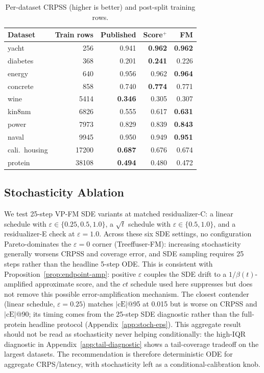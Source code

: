 \documentclass{tpm2026}
\begin{document}
\begin{table}[!t]
  \centering
  \caption{Per-dataset CRPSS (higher is better) and post-split training rows.}\label{tab:per-dataset}
  \footnotesize
  \begin{tabular}{lrrrr}
    \toprule
    Dataset & Train rows & Published & Score$^+$ & FM \\
    \midrule
    yacht & 256 & 0.941 & \textbf{0.962} & \textbf{0.962} \\
    diabetes & 368 & 0.201 & \textbf{0.241} & 0.226 \\
    energy & 640 & 0.956 & 0.962 & \textbf{0.964} \\
    concrete & 858 & 0.740 & \textbf{0.774} & 0.771 \\
    wine & 5414 & \textbf{0.346} & 0.305 & 0.307 \\
    kin8nm & 6826 & 0.555 & 0.617 & \textbf{0.631} \\
    power & 7973 & 0.829 & 0.839 & \textbf{0.843} \\
    naval & 9945 & 0.950 & 0.949 & \textbf{0.951} \\
    cali.\ housing & 17200 & \textbf{0.687} & 0.676 & 0.674 \\
    protein & 38108 & \textbf{0.494} & 0.480 & 0.472 \\
    \bottomrule
  \end{tabular}
\end{table}

\subsection{Stochasticity Ablation}\label{sec:abl-sde}
We test 25-step VP-FM SDE variants at matched residualizer-C: a linear schedule with $\varepsilon \in \{0.25, 0.5, 1.0\}$, a $\sqrt{t}$ schedule with $\varepsilon \in \{0.5, 1.0\}$, and a residualizer-E check at $\varepsilon=1.0$. Across these six SDE settings, no configuration Pareto-dominates the $\varepsilon = 0$ corner (Treeffuser-FM): increasing stochasticity generally worsens CRPSS and coverage error, and SDE sampling requires 25 steps rather than the headline 5-step ODE. This is consistent with Proposition~\ref{prop:endpoint-amp}: positive $\varepsilon$ couples the SDE drift to a $1/\beta(t)$-amplified approximate score, and the $ct$ schedule used here suppresses but does not remove this possible error-amplification mechanism. The closest contender (linear schedule, $\varepsilon=0.25$) matches $|\text{cE}|$@95 at 0.015 but is worse on CRPSS and $|\text{cE}|$@90; its timing comes from the 25-step SDE diagnostic rather than the full-protein headline protocol (Appendix~\ref{app:stoch-eps}). This aggregate result should not be read as stochasticity never helping conditionally: the high-IQR diagnostic in Appendix~\ref{app:tail-diagnostic} shows a tail-coverage tradeoff on the largest datasets. The recommendation is therefore deterministic ODE for aggregate CRPS/latency, with stochasticity left as a conditional-calibration knob.
\end{document}
